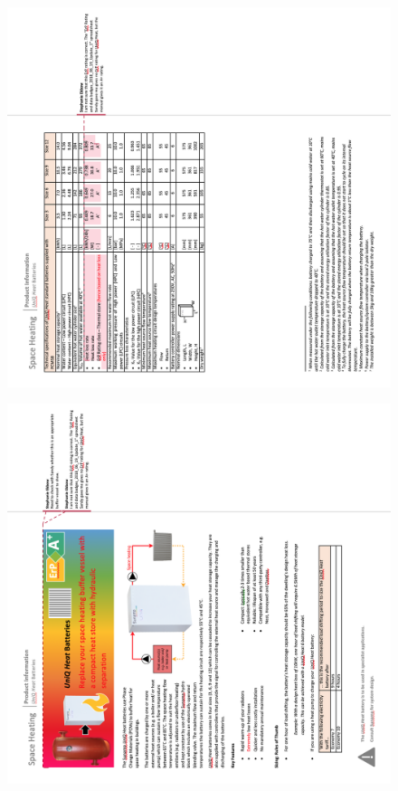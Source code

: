 \newpage
\begin{figure}
	\centering
	\includegraphics[height=0.48\textheight]{Appendices/4_PIS_Heat_02M.png}
\end{figure}

\begin{figure}
	\centering
	\includegraphics[height=0.48\textheight]{Appendices/4_PIS_Heat_01M.png}
\end{figure}


